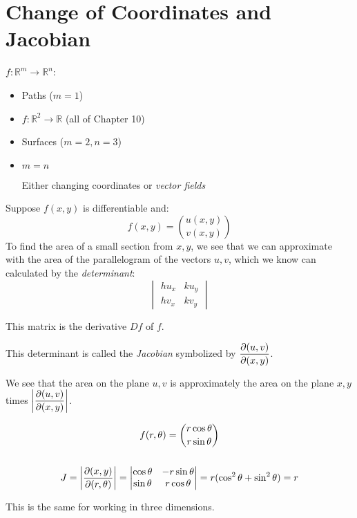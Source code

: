 \documentclass[00_complete]{subfiles}
\begin{document}
\section{Change of Coordinates and Jacobian}
\begin{reminder}
    $f: \mathbb{R}^m \to \mathbb{R}^n$:
    \begin{itemize} \tightlist
        \item Paths ($m=1$)
        \item $f: \mathbb{R}^2 \to \mathbb{R}$ (all of Chapter 10)
        \item Surfaces ($m=2,n=3$)
        \item $m=n$

            Either changing coordinates or \emph{vector fields}
    \end{itemize}
\end{reminder}
Suppose $f(x,y)$ is differentiable and:
$$f(x,y)=\binom{u(x,y)}{v(x,y)}$$
To find the area of a small section from $x,y$, we see that we can approximate
with the area of the parallelogram of the vectors $u,v$, which we know can
calculated by the \emph{determinant}:
$$\begin{vmatrix}
    hu_x&ku_y \\ hv_x&kv_y
\end{vmatrix}$$
\begin{note}
    This matrix is the derivative $Df$ of $f$.
\end{note}
\begin{definition}[Jacobian]
    This determinant is called the \emph{Jacobian} symbolized by
    $\displaystyle \pdv{(u,v)}{(x,y)}$.
\end{definition}
We see that the area on the plane  $u,v$ is approximately the area on the plane
$x,y$ times $\displaystyle\left|\pdv{(u,v)}{(x,y)}\right|$.
\begin{example}
    \begin{gather*}
    f(r,\theta)=\binom{r\cos \theta}{r\sin\theta} \\ \\
    J = \left|\pdv{(x,y)}{(r,\theta)}\right|=\begin{vmatrix}
        \cos\theta &-r\sin\theta \\
        \sin\theta &r\cos\theta
    \end{vmatrix} = r(\cos^2\theta+\sin^2\theta)=r
    \end{gather*}
\end{example}
\begin{note}
    This is the same for working in three dimensions.
\end{note}
\end{document}
